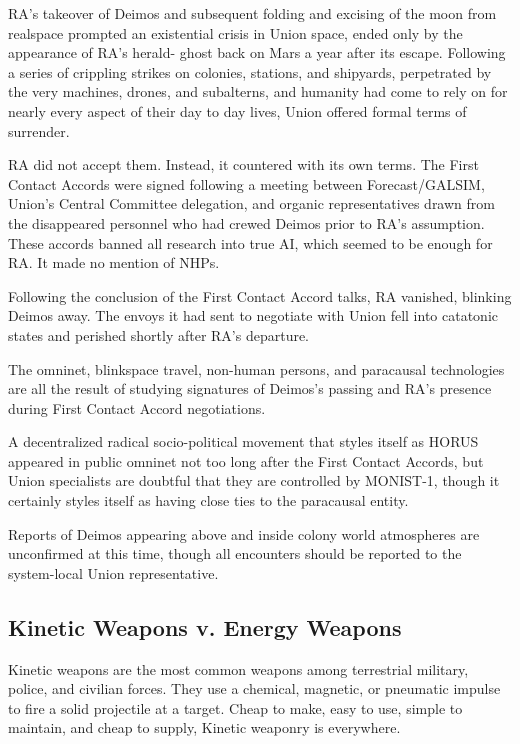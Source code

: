 RA's takeover of Deimos and subsequent folding and excising of the moon from realspace
prompted an existential crisis in Union space, ended only by the appearance of RA's herald-
ghost back on Mars a year after its escape. Following a series of crippling strikes on colonies,
stations, and shipyards, perpetrated by the very machines, drones, and subalterns, and humanity
had come to rely on for nearly every aspect of their day to day lives, Union offered formal terms
of surrender.

RA did not accept them. Instead, it countered with its own terms. The First Contact Accords
were signed following a meeting between Forecast/GALSIM, Union's Central Committee
delegation, and organic representatives drawn from the disappeared personnel who had crewed
Deimos prior to RA's assumption. These accords banned all research into true AI, which seemed
to be enough for RA. It made no mention of NHPs.

Following the conclusion of the First Contact Accord talks, RA vanished, blinking Deimos away.
The envoys it had sent to negotiate with Union fell into catatonic states and perished shortly after
RA's departure.

The omninet, blinkspace travel, non-human persons, and paracausal technologies are all the
result of studying signatures of Deimos's passing and RA's presence during First Contact Accord
negotiations.

A decentralized radical socio-political movement that styles itself as HORUS appeared in public
omninet not too long after the First Contact Accords, but Union specialists are doubtful that they
are controlled by MONIST-1, though it certainly styles itself as having close ties to the paracausal
entity.

Reports of Deimos appearing above and inside colony world atmospheres are unconfirmed at
this time, though all encounters should be reported to the system-local Union representative.

\subsection{Kinetic Weapons v. Energy Weapons}

Kinetic weapons are the most common weapons among terrestrial military, police, and civilian
forces. They use a chemical, magnetic, or pneumatic impulse to fire a solid projectile at a target.
Cheap to make, easy to use, simple to maintain, and cheap to supply, Kinetic weaponry is
everywhere.

